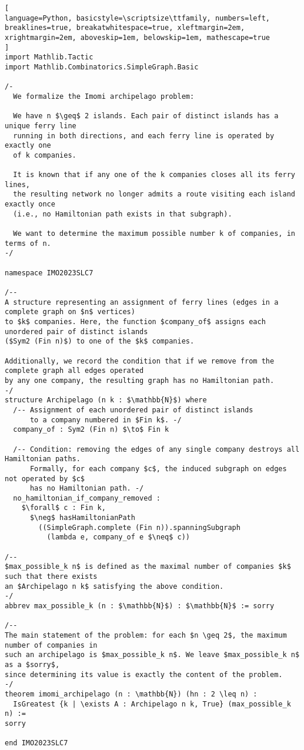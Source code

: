 \begin{tcolorbox}[enhanced, breakable, rounded corners,
    colback=green!5!white, colframe=green!75!black,
    colbacktitle=green!85!black, fonttitle=\bfseries, coltitle=white, title=Lean Theorem for 2023 IMO Shortlist Combinatorics Problem 7]
\setlength{\parskip}{1em}
\begin{lstlisting}[
language=Python, basicstyle=\scriptsize\ttfamily, numbers=left, breaklines=true, breakatwhitespace=true, xleftmargin=2em, xrightmargin=2em, aboveskip=1em, belowskip=1em, mathescape=true
]
import Mathlib.Tactic
import Mathlib.Combinatorics.SimpleGraph.Basic

/- 
  We formalize the Imomi archipelago problem:

  We have n $\geq$ 2 islands. Each pair of distinct islands has a unique ferry line 
  running in both directions, and each ferry line is operated by exactly one 
  of k companies. 

  It is known that if any one of the k companies closes all its ferry lines, 
  the resulting network no longer admits a route visiting each island exactly once 
  (i.e., no Hamiltonian path exists in that subgraph). 

  We want to determine the maximum possible number k of companies, in terms of n.
-/

namespace IMO2023SLC7

/--
A structure representing an assignment of ferry lines (edges in a complete graph on $n$ vertices)
to $k$ companies. Here, the function $company_of$ assigns each unordered pair of distinct islands
($Sym2 (Fin n)$) to one of the $k$ companies.

Additionally, we record the condition that if we remove from the complete graph all edges operated
by any one company, the resulting graph has no Hamiltonian path.
-/
structure Archipelago (n k : $\mathbb{N}$) where
  /-- Assignment of each unordered pair of distinct islands 
      to a company numbered in $Fin k$. -/
  company_of : Sym2 (Fin n) $\to$ Fin k

  /-- Condition: removing the edges of any single company destroys all Hamiltonian paths. 
      Formally, for each company $c$, the induced subgraph on edges not operated by $c$
      has no Hamiltonian path. -/
  no_hamiltonian_if_company_removed :
    $\forall$ c : Fin k,
      $\neg$ hasHamiltonianPath
        ((SimpleGraph.complete (Fin n)).spanningSubgraph
          (lambda e, company_of e $\neq$ c))

/--
$max_possible_k n$ is defined as the maximal number of companies $k$ such that there exists
an $Archipelago n k$ satisfying the above condition.
-/
abbrev max_possible_k (n : $\mathbb{N}$) : $\mathbb{N}$ := sorry

/--
The main statement of the problem: for each $n \geq 2$, the maximum number of companies in
such an archipelago is $max_possible_k n$. We leave $max_possible_k n$ as a $sorry$,
since determining its value is exactly the content of the problem.
-/
theorem imomi_archipelago (n : \mathbb{N}) (hn : 2 \leq n) :
  IsGreatest {k | \exists A : Archipelago n k, True} (max_possible_k n) :=
sorry

end IMO2023SLC7
\end{lstlisting}
\end{tcolorbox}